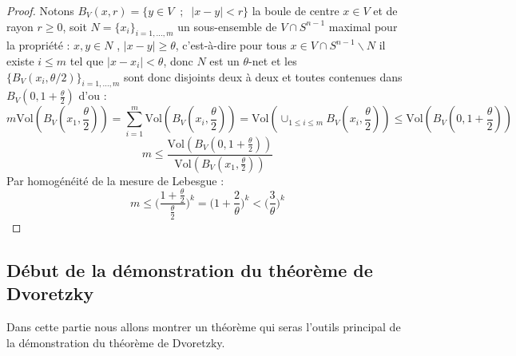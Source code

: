 \documentclass[12pt]{article}
\theoremstyle{definition}
\begin{document}
\begin{proof}
	Notons $B_V(x,r)=\big\{y\in V\; \; ; \; \; |x-y|< r\big\}$ la boule de centre $x\in V$ et de rayon $r\geq 0$, soit $N=\{x_i\}_{i=1,...,m}$ un sous-ensemble de $V\cap S^{n-1}$ maximal pour la propriété : $x,y\in N$ , $|x-y|\geq \theta$, c'est-à-dire pour tous $x\in V\cap S^{n-1}\backslash N$ il existe $i\leq m$ tel que $|x-x_i|<\theta$, donc $N$ est un $\theta$-net et les $\big\{B_V(x_i,\theta/2)\big\}_{i=1,...,m}$ sont donc disjoints deux à deux et toutes contenues dans $B_V(0,1+\frac{\theta}{2})$ d'ou : 
	\begin{equation*}
	m \text{Vol}(B_V(x_1,\frac{\theta}{2}))= \sum_{i=1}^{m}\text{Vol}(B_V(x_i,\frac{\theta}{2}))= \text{Vol}(\cup_{1\leq i \leq m} B_V(x_i,\frac{\theta}{2}))\leq \text{Vol}(B_V(0,1+\frac{\theta}{2}))
	\end{equation*}
	\begin{equation*}
	m\leq \frac{\text{Vol}(B_V(0,1+\frac{\theta}{2}))}{\text{Vol}(B_V(x_1,\frac{\theta}{2}))} 
	\end{equation*}
	Par homogénéité de la mesure de Lebesgue :
	\begin{equation*}
	m\leq\Bigg(\frac{1+\frac{\theta}{2}}{\frac{\theta}{2}}\Bigg)^k=  \Bigg(1+\frac{2}{\theta}\Bigg)^k<\big(\frac{3}{\theta}\big)^k
	\end{equation*}
\end{proof}

\subsection{Début de la démonstration du théorème de Dvoretzky}
Dans cette partie nous allons montrer un théorème qui seras l'outils principal de la démonstration du théorème de Dvoretzky.
\end{document}
